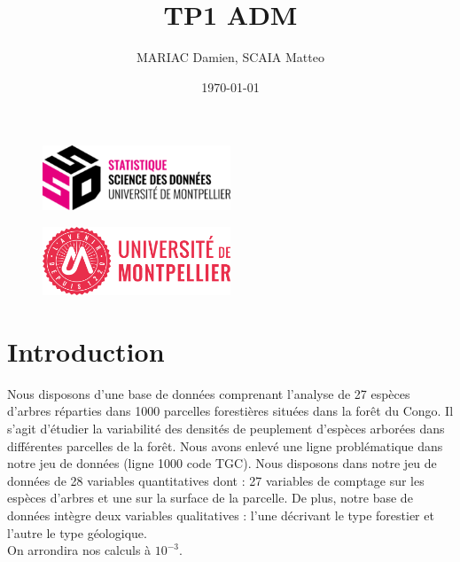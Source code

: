 \documentclass{article}
\title{TP1 ADM}
\author{MARIAC Damien, SCAIA Matteo}
\date{\today}
\begin{document}
\maketitle

\begin{figure}[h] 
    \centering
    \includegraphics[width=0.5\textwidth]{ssd_logo.png} 
\end{figure}

\begin{figure}[h] 
    \centering
    \includegraphics[width=0.5\textwidth]{logo_um_2022_rouge_RVB.png} 
\end{figure}

\newpage

\tableofcontents

\newpage

\section{Introduction}
Nous disposons d'une base de données comprenant l'analyse de 27 espèces d'arbres réparties dans 1000 parcelles forestières situées dans la forêt du Congo.
Il s'agit d'étudier la variabilité des densités de peuplement d'espèces arborées dans différentes parcelles de la forêt.  Nous avons enlevé une ligne problématique dans notre jeu de données (ligne 1000 code TGC).
Nous disposons dans notre jeu de données de 28 variables quantitatives dont : 27 variables de comptage sur les espèces d'arbres et une sur la surface de la parcelle. De plus, notre base de données intègre deux variables qualitatives : l'une décrivant le type forestier et l'autre le type géologique.
\\
On arrondira nos calculs à $10^{-3}$.
\end{document}
